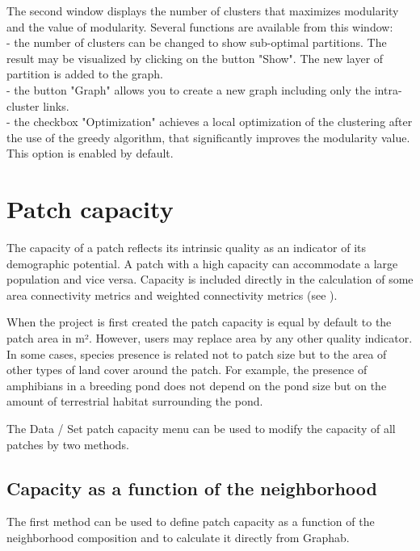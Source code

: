\documentclass{article}
\begin{document}
The second window displays the number of clusters that maximizes modularity and the value of modularity.
Several functions are available from this window:\\
{}- the number of clusters can be changed to show sub-optimal partitions. The result may be visualized by clicking on the button "Show". The new layer of partition is added to the graph.\\
{}- the button "Graph" allows you to create a new graph including only the intra-cluster links.\\
{}- the checkbox "Optimization" achieves a local optimization of the clustering after the use of the greedy algorithm, that significantly improves the modularity value. This option is enabled by default.

\section{Patch capacity}

The capacity of a patch reflects its intrinsic quality as an indicator of its demographic potential. A patch with a high capacity can accommodate a large population and vice versa. Capacity is included directly in the calculation of some area connectivity metrics and weighted connectivity metrics (see ).

When the project is first created the patch capacity is equal by default to the patch area in m². However, users may replace area by any other quality indicator. In some cases, species presence is related not to patch size but to the area of other types of land cover around the patch. For example, the presence of amphibians in a breeding pond does not depend on the pond size but on the amount of terrestrial habitat
surrounding the pond.

The Data / Set patch capacity menu can be used to modify the capacity of all patches by two methods.

\subsection{Capacity as a function of the neighborhood}

The first method can be used to define patch capacity as a function of the neighborhood composition and to calculate it directly from Graphab. 
\end{document}
